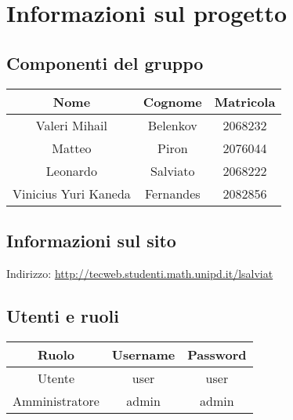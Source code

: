 \section{Informazioni sul progetto}
\subsection{Componenti del gruppo}

\begin{table}[H]
    \centering
    \begin{tabular}{|c|c|c|}
        \hline
        \cellcolor[HTML]{FFCC00} \textbf{Nome} & \cellcolor[HTML]{FFCC00} \textbf{Cognome} & \cellcolor[HTML]{FFCC00} \textbf{Matricola}  \\ 
        \hline
        Valeri Mihail & Belenkov & 2068232 \\ 
        \hline
        Matteo & Piron & 2076044\\ 
        \hline
        Leonardo & Salviato & 	2068222  \\ 
        \hline
        Vinicius Yuri Kaneda & Fernandes & 	2082856 \\ 
        \hline
    \end{tabular}
\end{table}

\subsection{Informazioni sul sito}
Indirizzo: \url{http://tecweb.studenti.math.unipd.it/lsalviat} 

\subsection{Utenti e ruoli}
\begin{table}[H]
    \centering
    \begin{tabular}{|c|c|c|}
        \hline
        \cellcolor[HTML]{FFCC00} \textbf{Ruolo} & \cellcolor[HTML]{FFCC00} \textbf{Username} & \cellcolor[HTML]{FFCC00} \textbf{Password}       \\ 
        \hline
        Utente & user & user \\ 
        \hline
        Amministratore & admin & admin\\ 
        \hline
    \end{tabular}
\end{table}
